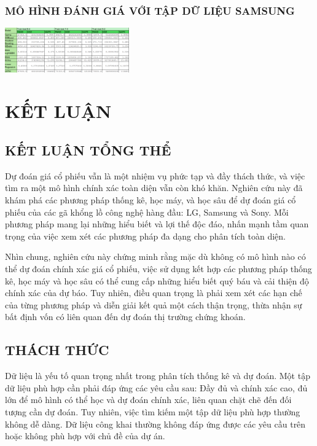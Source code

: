\documentclass[conference]{IEEEtran}
\begin{document}
\subsubsection{MÔ HÌNH ĐÁNH GIÁ VỚI TẬP DỮ LIỆU SAMSUNG}
\includegraphics[width=0.4\textwidth]{Image/ket qua/SS_metrics.png}
\section{KẾT LUẬN }

\subsection{KẾT LUẬN TỔNG THỂ }

Dự đoán giá cổ phiếu vẫn là một nhiệm vụ phức tạp và đầy thách thức, và việc tìm ra một mô hình chính xác toàn diện vẫn còn khó khăn. Nghiên cứu này đã khám phá các phương pháp thống kê, học máy, và học sâu để dự đoán giá cổ phiếu của các gã khổng lồ công nghệ hàng đầu: LG, Samsung và Sony. Mỗi phương pháp mang lại những hiểu biết và lợi thế độc đáo, nhấn mạnh tầm quan trọng của việc xem xét các phương pháp đa dạng cho phân tích toàn diện.

Nhìn chung, nghiên cứu này chứng minh rằng mặc dù không có mô hình nào có thể dự đoán chính xác giá cổ phiếu, việc sử dụng kết hợp các phương pháp thống kê, học máy và học sâu có thể cung cấp những hiểu biết quý báu và cải thiện độ chính xác của dự báo. Tuy nhiên, điều quan trọng là phải xem xét các hạn chế của từng phương pháp và diễn giải kết quả một cách thận trọng, thừa nhận sự bất định vốn có liên quan đến dự đoán thị trường chứng khoán.

\subsection{THÁCH THỨC  }

Dữ liệu là yếu tố quan trọng nhất trong phân tích thống kê và dự đoán. Một tập dữ liệu phù hợp cần phải đáp ứng các yêu cầu sau: Đầy đủ và chính xác cao, đủ lớn để mô hình có thể học và dự đoán chính xác, liên quan chặt chẽ đến đối tượng cần dự đoán. Tuy nhiên, việc tìm kiếm một tập dữ liệu phù hợp thường không dễ dàng. Dữ liệu công khai thường không đáp ứng được các yêu cầu trên hoặc không phù hợp với chủ đề của dự án.
\end{document}
